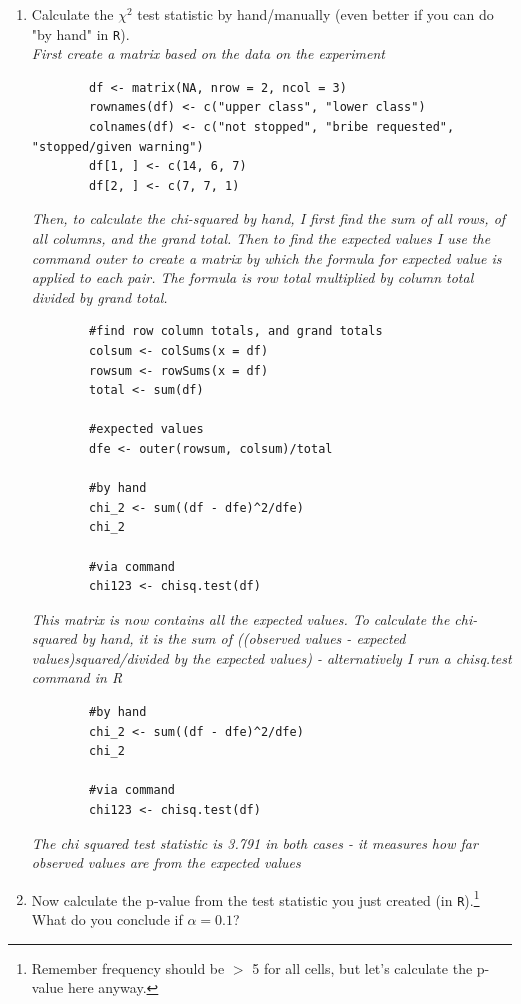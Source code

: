 \documentclass[12pt,letterpaper]{article}
\begin{document}
\begin{enumerate}
	
	\item [(a)]
	Calculate the $\chi^2$ test statistic by hand/manually (even better if you can do "by hand" in \texttt{R}).\\
	
	\vspace{.5cm}
	\textit{First create a matrix based on the data on the experiment}
	\begin{verbatim}
		df <- matrix(NA, nrow = 2, ncol = 3)
		rownames(df) <- c("upper class", "lower class")
		colnames(df) <- c("not stopped", "bribe requested", "stopped/given warning")
		df[1, ] <- c(14, 6, 7)
		df[2, ] <- c(7, 7, 1)
	\end{verbatim}
	
	\vspace{.5cm}		
	\textit{Then, to calculate the chi-squared by hand, I first find the sum of all rows, of all columns, and the grand total. Then to find the expected values I use the command outer to create a matrix by which the formula for  expected value is applied to each pair. The formula is row total multiplied by column total divided by grand total.}
		\begin{verbatim}
		#find row column totals, and grand totals
		colsum <- colSums(x = df)
		rowsum <- rowSums(x = df)
		total <- sum(df)
		
		#expected values
		dfe <- outer(rowsum, colsum)/total
		
		#by hand
		chi_2 <- sum((df - dfe)^2/dfe)
		chi_2
		
		#via command
		chi123 <- chisq.test(df)
	\end{verbatim}
	
	\vspace{.5cm}		
\textit{This matrix is now contains all the expected values. To calculate the chi-squared by hand, it is the sum of ((observed values - expected values)squared/divided by the expected values) - alternatively I run a chisq.test command in R}
	\begin{verbatim}		
		#by hand
		chi_2 <- sum((df - dfe)^2/dfe)
		chi_2
		
		#via command
		chi123 <- chisq.test(df)
	\end{verbatim}
\textit{The chi squared test statistic is 3.791 in both cases - it measures how far observed values are from the expected values}
	\vspace{1cm}
	
	\item [(b)]
	Now calculate the p-value from the test statistic you just created (in \texttt{R}).\footnote{Remember frequency should be $>$ 5 for all cells, but let's calculate the p-value here anyway.}  What do you conclude if $\alpha = 0.1$?\\
	\vspace{.5cm}
	

\end{enumerate}
\end{document}
